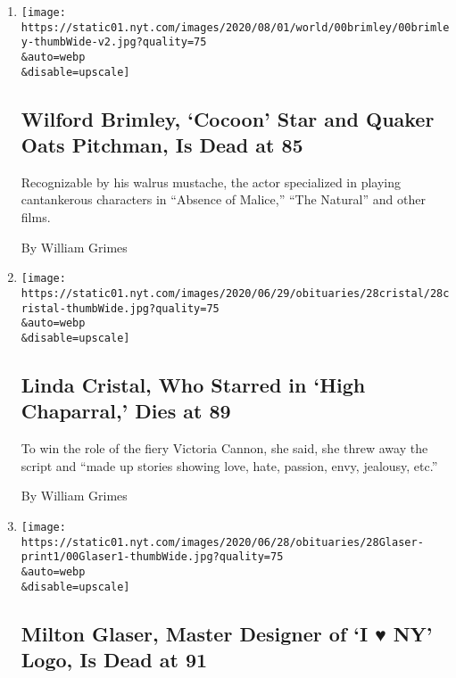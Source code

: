 \begin{enumerate}
\def\labelenumi{\arabic{enumi}.}
\item
  \href{/2020/08/01/obituaries/wilford-brimley-dead.html}{}

  \texttt{[image: https://static01.nyt.com/images/2020/08/01/world/00brimley/00brimley-thumbWide-v2.jpg?quality=75\\\&auto=webp\\\&disable=upscale]}

  \hypertarget{wilford-brimley-cocoon-star-and-quaker-oats-pitchman-is-dead-at-85}{%
  \subsection{Wilford Brimley, `Cocoon' Star and Quaker Oats Pitchman,
  Is Dead at
  85}\label{wilford-brimley-cocoon-star-and-quaker-oats-pitchman-is-dead-at-85}}

  Recognizable by his walrus mustache, the actor specialized in playing
  cantankerous characters in ``Absence of Malice,'' ``The Natural'' and
  other films.

  By William Grimes
\item
  \href{/2020/06/28/obituaries/linda-cristal-dead.html}{}

  \texttt{[image: https://static01.nyt.com/images/2020/06/29/obituaries/28cristal/28cristal-thumbWide.jpg?quality=75\\\&auto=webp\\\&disable=upscale]}

  \hypertarget{linda-cristal-who-starred-in-high-chaparral-dies-at-89}{%
  \subsection{Linda Cristal, Who Starred in `High Chaparral,' Dies at
  89}\label{linda-cristal-who-starred-in-high-chaparral-dies-at-89}}

  To win the role of the fiery Victoria Cannon, she said, she threw away
  the script and ``made up stories showing love, hate, passion, envy,
  jealousy, etc.''

  By William Grimes
\item
  \href{/2020/06/26/obituaries/milton-glaser-dead.html}{}

  \texttt{[image: https://static01.nyt.com/images/2020/06/28/obituaries/28Glaser-print1/00Glaser1-thumbWide.jpg?quality=75\\\&auto=webp\\\&disable=upscale]}

  \hypertarget{milton-glaser-master-designer-of-i--ny-logo-is-dead-at-91}{%
  \subsection{Milton Glaser, Master Designer of `I ♥ NY' Logo, Is Dead
  at
  91}\label{milton-glaser-master-designer-of-i--ny-logo-is-dead-at-91}}


\end{enumerate}
